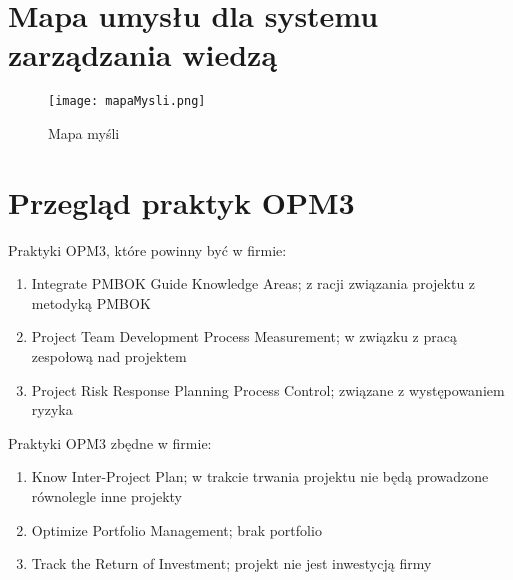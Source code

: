 
\section{Mapa umysłu dla systemu zarządzania wiedzą}

\begin{figure}[!h]
\centering
\texttt{[image: mapaMysli.png]}
\caption{Mapa myśli}
\label{fig:mapaMysli}
\end{figure}

\clearpage


\section{Przegląd praktyk OPM3}

Praktyki OPM3, które powinny być w firmie:

\begin{enumerate}
\item Integrate PMBOK Guide Knowledge Areas; z racji związania projektu z metodyką PMBOK
\item Project Team Development Process Measurement; w związku z pracą zespołową nad projektem
\item Project Risk Response Planning Process Control; związane z występowaniem ryzyka
\end{enumerate}

Praktyki OPM3 zbędne w firmie:

\begin{enumerate}
\item Know Inter-Project Plan; w trakcie trwania projektu nie będą prowadzone równolegle inne projekty
\item Optimize Portfolio Management; brak portfolio
\item Track the Return of Investment; projekt nie jest inwestycją firmy
\end{enumerate}

